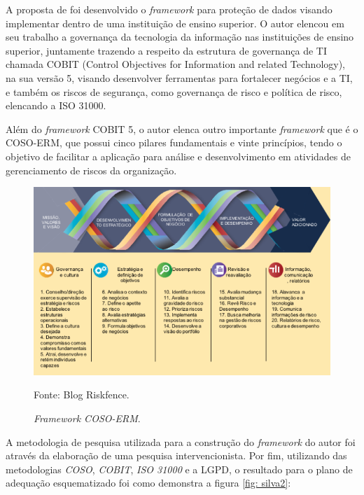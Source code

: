\documentclass[
	12pt,				%
	openright,			%
	oneside,			%
	a4paper,			%
	english,			%
	french,				%
	spanish,			%
	brazil,				%
	]{abntex2}
\begin{document}
A proposta de  foi desenvolvido o \textit{framework} para proteção de dados visando implementar dentro de uma instituição de ensino superior. O autor elencou em seu trabalho a governança da tecnologia da informação nas instituições de ensino superior, juntamente trazendo a respeito da estrutura de governança de TI chamada COBIT (Control Objectives for Information and related Technology), na sua versão 5, visando desenvolver ferramentas para fortalecer negócios e a TI, e também os riscos de segurança, como governança de risco e política de risco, elencando a ISO 31000.

Além do \textit{framework}  COBIT 5, o autor elenca outro importante \textit{framework}  que é o COSO-ERM, que possui cinco pilares fundamentais e vinte princípios, tendo o objetivo de facilitar a aplicação para análise e desenvolvimento em atividades de gerenciamento de riscos da organização.

\begin{figure}[ht]
    \centering
    \caption{\textit{Framework COSO-ERM}.}
    \includegraphics[width=6.8in]{Images/12Silva2020.png}
    \label{fig: 12Silva}
    
    \centering \small Fonte: Blog Riskfence.
\end{figure}

\pagebreak

A metodologia de pesquisa utilizada para a construção do \textit{framework} do autor foi através da elaboração de uma pesquisa intervencionista. Por fim, utilizando das metodologias \textit{COSO}, \textit{COBIT}, \textit{ISO 31000} e a LGPD, o resultado para o plano de adequação esquematizado foi como demonstra a figura \ref{fig: silva2}: 
\end{document}
